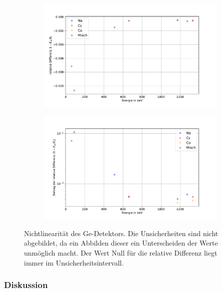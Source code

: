 \documentclass[
	a4paper,
	12pt,
	pagesize,
	ngerman
]{scrartcl}
\begin{document}
\begin{figure}[H]
		\centering
		\begin{subfigure}[t]{0.8\textwidth}
			\centering
			\includegraphics[width= \linewidth]{img/diff_ge.pdf}
		\end{subfigure}
		\begin{subfigure}[t]{0.8\textwidth}
			\centering
			\includegraphics[width= \linewidth]{img/diff_ge_log.pdf}
		\end{subfigure}
		\caption{Nichtlinearität des Ge-Detektors.
		Die Unsicherheiten sind nicht abgebildet, da ein Abbilden dieser ein Unterscheiden der Werte unmöglich macht.
		Der Wert Null für die relative Differenz liegt immer im Unsicherheitsintervall.
		}
		\label{fg_diff_ge}
	\end{figure}


	\subsubsection{Diskussion}
\end{document}
